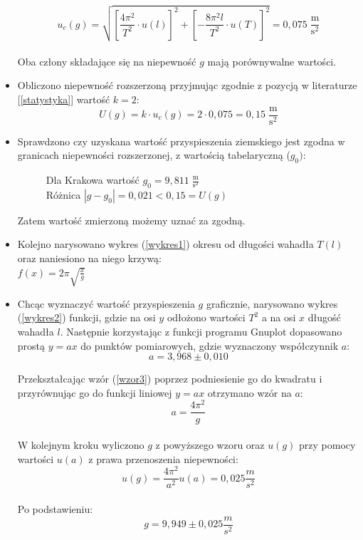 \documentclass{article}
\begin{document}
\begin{itemize}
		\begin{equation*}
			u_c(g) = \sqrt{ \left[ \frac{4\pi^2}{T^2}\cdot u(l) \right]^2 + \left[ -\frac{8\pi^2 l}{T^2} \cdot u(T) \right]^2 }
			 = 	0,075 \; \frac{\text{m}}{\text{s}^2}
		\end{equation*}\\
	Oba człony składające się na niepewność $g$ mają porównywalne wartości.\\
	
	
	\item Obliczono niepewność rozszerzoną przyjmując zgodnie z pozycją w literaturze [\ref{statystyka}] wartość $k=2$:
		\begin{equation*}
			U(g)=k\cdot u_c(g) = 2\cdot 0,075 = 0,15 \; \frac{\text{m}}{\text{s}^2}
		\end{equation*}
	\item Sprawdzono czy uzyskana wartość przyspieszenia ziemskiego jest zgodna w granicach niepewności rozszerzonej, z wartością tabelaryczną ($g_0)$:
	\begin{figure}[h!]
		\centering
			Dla Krakowa wartość $g_0 = 9,811\; \frac{\text{m}}{\text{s}^2}$\\
			Różnica $|g-g_0| = 0,021 < 0,15 = U(g)$
	\end{figure}


	
	Zatem wartość zmierzoną możemy uznać za zgodną.
	
	
	
	\item Kolejno narysowano wykres (\ref{wykres1}) okresu od długości wahadła $T(l)$ oraz naniesiono na niego krzywą: \\
	$f(x)=2\pi\sqrt{\frac{x}{g}}$\\
	

	
	
	\item Chcąc wyznaczyć wartość przyspieszenia $g$ graficznie, narysowano wykres (\ref{wykres2}) funkcji, 
	gdzie na osi $y$ odłożono wartości $T^2$ a na osi $x$ długość wahadła $l$. Następnie korzystając z funkcji programu Gnuplot dopasowano prostą $y=ax$ do punktów pomiarowych, gdzie wyznaczony współczynnik $a$: \\ %
	\[a = 3,968 \pm 0,010
	\]
	

	Przekształcając wzór (\ref{wzor3}) poprzez podniesienie go do kwadratu i przyrównując go do funkcji liniowej $y=ax$ otrzymano wzór na $a$:\\
	\[a=\frac{4\pi^2}{g}
	\]\\
	W kolejnym kroku wyliczono $g$ z powyższego wzoru oraz $u(g)$ przy pomocy wartości $u(a)$ z prawa przenoszenia niepewności:\\
	\[u(g) = \frac{4\pi^2}{a^2}u(a) = 0,025 \frac{m}{s^2}
	\]\\
	Po podstawieniu:\\
	\[g = 9,949 \pm 0,025 \frac{m}{s^2}
	\]
	

  \end{itemize}
\end{document}
